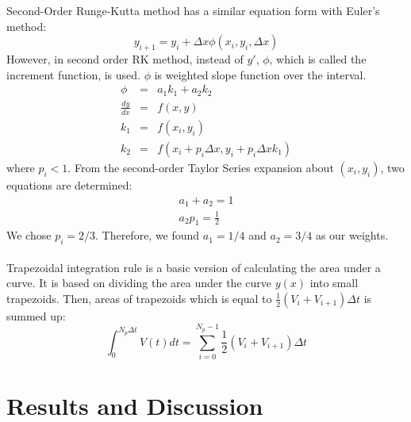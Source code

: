 \documentclass[letterpaper,12pt]{article}
\begin{document}
Second-Order Runge-Kutta method has a similar equation form with Euler's method:
\begin{equation}
y_{i+1} = y_i + \Delta x \phi (x_i , y_i, \Delta x)
\label{eq:rk2}
\end{equation}
However, in second order RK method, instead of $y\prime $, $\phi$, which is 
called the increment function, is used. $\phi$ is weighted slope function over the interval.
\begin{eqnarray}
\phi&=&a_1k_1 + a_2k_2\\
\frac{dy}{dx}&=&f(x,y) \nonumber\\
k_1&=&f(x_i,y_i) \nonumber\\
k_2&=&f(x_i+p_i\Delta x, y_i+p_i\Delta x k_1) \nonumber
\end{eqnarray}
where $p_i<1$.
From the second-order Taylor Series expansion about $(x_i,y_i)$, two equations are determined:
\begin{eqnarray}
a_1+a_2 = 1  \nonumber \\
a_2p_1 = \frac{1}{2} \nonumber 
\end{eqnarray}
We chose $p_i = 2/3 $. Therefore, we found $a_1=1/4$ and $a_2=3/4$ as our weights.
\\\\
Trapezoidal integration rule is a basic version of calculating the area under a curve. It is based on
dividing the area under the curve $y(x)$ into small trapezoids. Then, areas of trapezoids which is equal to 
$\frac {1}{2}(V_i+V_{i+1})\Delta t $ is summed up:
\begin{equation}
\int_{0}^{N_p\Delta t} V(t) dt = \sum_{i=0}^{N_p-1} \frac{1}{2}(V_i+V_{i+1}) \Delta t 
\end{equation}

\newpage

\section{Results and Discussion}
\end{document}
